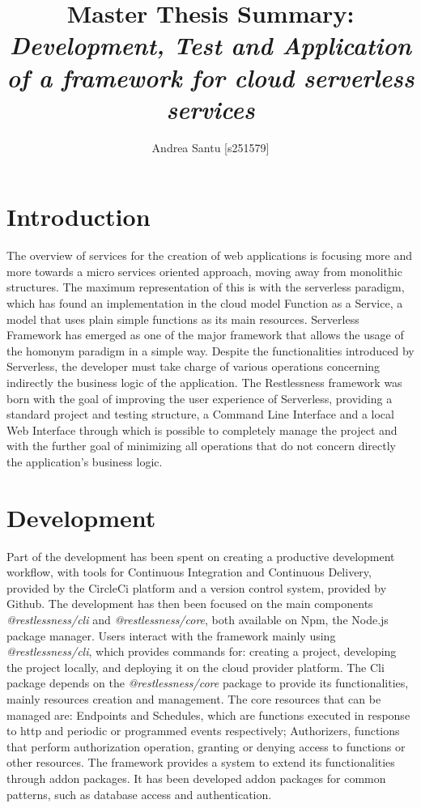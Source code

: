 \documentclass{article}
\begin{document}
\title{Master Thesis Summary: \textit{Development, Test and Application of a framework for cloud serverless services}}

\author{Andrea Santu [s251579]}

\maketitle

\section{Introduction}
The overview of services for the creation of web applications is focusing more
and more towards a micro services oriented approach, moving away from monolithic
structures.
The maximum representation of this is with the serverless paradigm, which has
found an implementation in the cloud model Function as a Service, a model that
uses plain simple functions as its main resources.
Serverless Framework has emerged as one of the major framework that allows the
usage of the homonym paradigm in a simple way.
Despite the functionalities introduced by Serverless, the developer must take
charge of various operations concerning indirectly the business logic of the
application.
The Restlessness framework was born with the goal of improving the user experience
of Serverless, providing a standard project and testing structure, a Command Line
Interface and a local Web Interface through which is possible to completely manage
the project and with the further goal of minimizing all operations that do not
concern directly the application's business logic.

\section{Development}
Part of the development has been spent on creating a productive development
workflow, with tools for Continuous Integration and Continuous Delivery, provided
by the CircleCi platform and a version control system, provided by Github.
The development has then been focused on the main components
\mbox{\textit{@restlessness/cli}} and \mbox{\textit{@restlessness/core}}, both
available on Npm, the Node.js package manager.
Users interact with the framework mainly using \mbox{\textit{@restlessness/cli}},
which provides commands for: creating a project, developing the project locally,
and deploying it on the cloud provider platform.
The Cli package depends on the \mbox{\textit{@restlessness/core}} package to provide
its functionalities, mainly resources creation and management. The core resources
that can be managed are: Endpoints and Schedules, which are functions executed in
response to http and periodic or programmed events respectively; Authorizers,
functions that perform authorization operation, granting or denying access to
functions or other resources.
The framework provides a system to extend its functionalities through addon packages.
It has been developed addon packages for common patterns, such as database access
and authentication.
\end{document}
